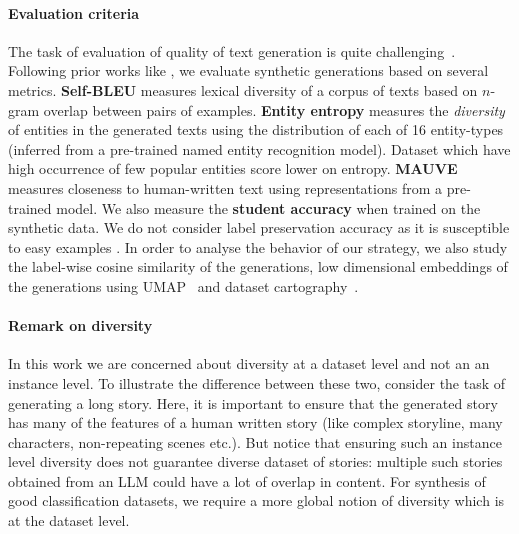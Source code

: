 


\paragraph{Evaluation criteria} The task of evaluation of quality of text generation is quite challenging~\citep{llm-eval-survey}. Following prior works like \cite{divekar2024synthesizrr}, we evaluate synthetic generations based on several metrics. \textbf{Self-BLEU} \citep{bleu,zhu2018texygen} measures lexical diversity of a corpus of texts based on $n$-gram overlap between pairs of examples. \textbf{Entity entropy} measures the \textit{diversity} of entities in the generated texts using the distribution of each of 16 entity-types (inferred from a pre-trained named entity recognition model). Dataset which have high occurrence of few popular entities score lower on entropy. \textbf{MAUVE} \citep{liu-etal:divergence:neurips2021} measures closeness to human-written text using representations from a pre-trained \GPTTwoXL{} model. We also measure the \textbf{student accuracy} when trained on the synthetic data. We do not consider label preservation accuracy as it is susceptible to easy examples \cite{divekar2024synthesizrr}. In order to analyse the behavior of our strategy, we also study the label-wise cosine similarity of the generations, low dimensional embeddings of the generations using UMAP~\cite{mcinnes2020umap} and dataset cartography~\cite{swayamdipta-etal-2020-dataset}. %

\paragraph{Remark on diversity} In this work we are concerned about diversity at a dataset level and not an an instance level. To illustrate the difference between these two, consider the task of generating a long story. Here, it is important to ensure that the generated story has many of the features of a human written story (like complex storyline, many characters, non-repeating scenes etc.). But notice that ensuring such an instance level diversity does not guarantee diverse dataset of stories: multiple such stories obtained from an LLM could have a lot of overlap in content. For synthesis of good classification datasets, we require a more global notion of diversity which is at the dataset level. 

